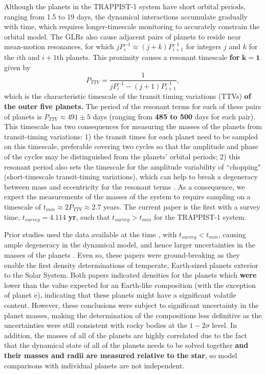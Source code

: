 \documentclass[twocolumn]{aastex63}
\begin{document}
Although the planets in the TRAPPIST-1 system have short orbital periods, ranging from
1.5 to 19 days, the dynamical interactions accumulate gradually with time, which requires
longer-timescale monitoring to accurately constrain the orbital model.
The GLRs also cause adjacent pairs of planets to reside near mean-motion resonances,
for which $j P_i^{-1} \approx (j+k) P_{i+1}^{-1}$ for integers $j$ and $k$ for the $i$th and $i+1$th planets.  This proximity causes a resonant timescale \textbf{for} $\mathbf{k=1}$
given by
\begin{equation}
    P_{TTV} = \frac{1}{j P_i^{-1} - (j+1) P_{i+1}^{-1}},
\end{equation}
\citep{Lithwick2012} which is the characteristic timescale of the transit timing variations (TTVs) \textbf{of
the outer five planets.}
The period of the resonant terms for each of these pairs of planets is $P_{TTV} \approx 491{\pm}5$
days (ranging from \textbf{485 to 500} days for each pair).  This timescale has two consequences for
measuring the masses of the planets from transit-timing variations:  1)  the transit times
for each planet need to be sampled on this timescale, preferable covering two cycles so that
the amplitude and phase of the cycles may be distinguished from the planets' orbital periods;
2) this resonant period also sets the timescale for the amplitude variability of ``chopping" (short-timescale
transit-timing variations), which can help to break a degeneracy between mass and eccentricity for the resonant terms
\citep{Lithwick2012,Deck2015}.  As a consequence, we expect the measurements of the masses
of the system to require sampling on a timescale of $t_{min} \approx 2 P_{TTV} \approx 2.7$ years.
The current paper is the first with a survey time, $t_{survey} \mathbf{= 4.114}$ \textbf{yr}, such that $t_{survey} {>} t_{min}$ for the TRAPPIST-1 system.

Prior studies used the data available at the time \citep{Delrez2018a}, with $t_{survey} {<} t_{min}$, causing ample
degeneracy in the dynamical model, and hence larger uncertainties in the masses of the planets
\citep{Gillon2017,Grimm2018}.  Even so, these papers were ground-breaking as they enable the
first density determinations of temperate, Earth-sized planets exterior to the Solar System.
Both papers indicated densities for the planets which \textbf{were} lower than the value expected for
an Earth-like composition (with the exception of planet e), indicating that these planets might
have a significant volatile content.  However, these conclusions were subject to significant
uncertainty in the planet masses, making the determination of the compositions less definitive as the uncertainties were still consistent with rocky bodies at the $1-2\sigma$ level.
In addition, the masses of all of the planets are highly correlated due to the fact that the
dynamical state of all of the planets needs to be solved together \textbf{and their masses and
radii are measured relative to the star}, so model comparisons with individual planets
are not independent.
\end{document}
